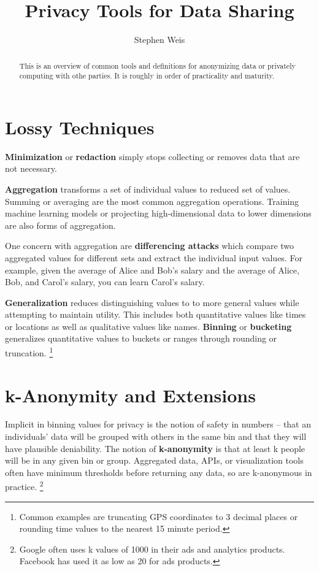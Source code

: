 \documentclass[nobib]{tufte-handout}
\title{Privacy Tools for Data Sharing}
\author[Stephen Weis]{Stephen Weis}
\begin{document}
\maketitle%

\begin{abstract} \noindent This is an overview of common tools and definitions
for anonymizing data or privately computing with othe parties. It is roughly in
order of practicality and maturity. \end{abstract}

\section{Lossy Techniques} \textbf{Minimization} or \textbf{redaction} simply
stops collecting or removes data that are not necessary.

\textbf{Aggregation} transforms a set of individual values to reduced set of
values. Summing or averaging are the most common aggregation operations.
Training machine learning models or projecting high-dimensional data to lower
dimensions are also forms of aggregation.

One concern with aggregation are \textbf{differencing attacks} which compare two
aggregated values for different sets and extract the individual input values.
For example, given the average of Alice and Bob’s salary and the average of
Alice, Bob, and Carol’s salary, you can learn Carol’s salary.

\textbf{Generalization} reduces distinguishing values to to more general values
while attempting to maintain utility. This includes both quantitative values
like times or locations as well as qualitative values like names.
\textbf{Binning} or \textbf{bucketing} generalizes quantitative values to
buckets or ranges through rounding or truncation. \footnote{Common examples are
truncating GPS coordinates to 3 decimal places or rounding time values to the
nearest 15 minute period.}

\section{k-Anonymity and Extensions}

Implicit in binning values for privacy is the notion of safety in numbers --
that an individuals’ data will be grouped with others in the same bin and that
they will have plausible deniability. The notion of
\textbf{k-anonymity} \cite{DBLP:journals/ijufks/Sweene02} is that at least k
people will be in any given bin or group. Aggregated data, APIs, or
visualization tools often have minimum thresholds before returning any data, so
are k-anonymous in practice. \footnote{Google often uses k values of 1000 in
their ads and analytics products. Facebook has used it as low as 20 for ads
products.}
\end{document}
